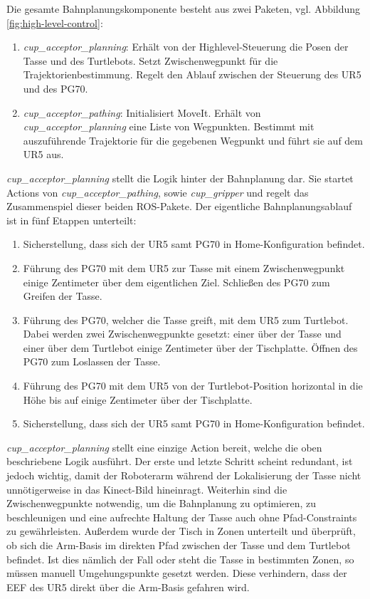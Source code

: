Die gesamte Bahnplanungskomponente besteht aus zwei Paketen, vgl. Abbildung \ref{fig:high-level-control}:
\begin{enumerate}
	\item \textit{cup\_acceptor\_planning}:
				\newline
				Erhält von der Highlevel-Steuerung die Posen der Tasse und des Turtlebots. Setzt Zwischenwegpunkt für die Trajektorienbestimmung. Regelt den Ablauf zwischen der Steuerung des UR5 und des PG70.
	\item \textit{cup\_acceptor\_pathing}:
				\newline
				Initialisiert MoveIt. Erhält von \textit{cup\_acceptor\_planning} eine Liste von Wegpunkten. Bestimmt mit auszuführende Trajektorie für die gegebenen Wegpunkt und führt sie auf dem UR5 aus.
\end{enumerate}
\textit{cup\_acceptor\_planning} stellt die Logik hinter der Bahnplanung dar. Sie startet Actions von \textit{cup\_acceptor\_pathing}, sowie \textit{cup\_gripper} und regelt das Zusammenspiel dieser beiden ROS-Pakete. Der eigentliche Bahnplanungsablauf ist in fünf Etappen unterteilt:
\begin{enumerate}
	\item Sicherstellung, dass sich der UR5 samt PG70 in Home-Konfiguration befindet.
	\item Führung des PG70 mit dem UR5 zur Tasse mit einem Zwischenwegpunkt einige Zentimeter über dem eigentlichen Ziel. Schließen des PG70 zum Greifen der Tasse.
	\item Führung des PG70, welcher die Tasse greift, mit dem UR5 zum Turtlebot. Dabei werden zwei Zwischenwegpunkte gesetzt: einer über der Tasse und einer über dem Turtlebot einige Zentimeter über der Tischplatte. Öffnen des PG70 zum Loslassen der Tasse.
	\item Führung des PG70 mit dem UR5 von der Turtlebot-Position horizontal in die Höhe bis auf einige Zentimeter über der Tischplatte.
	\item Sicherstellung, dass sich der UR5 samt PG70 in Home-Konfiguration befindet.
\end{enumerate}
\textit{cup\_acceptor\_planning} stellt eine einzige Action bereit, welche die oben beschriebene Logik ausführt. Der erste und letzte Schritt scheint redundant, ist jedoch wichtig, damit der Roboterarm während der Lokalisierung der Tasse nicht unnötigerweise in das Kinect-Bild hineinragt. Weiterhin sind die Zwischenwegpunkte notwendig, um die Bahnplanung zu optimieren, zu beschleunigen und eine aufrechte Haltung der Tasse auch ohne Pfad-Constraints zu gewährleisten. Außerdem wurde der Tisch in Zonen unterteilt und überprüft, ob sich die Arm-Basis im direkten Pfad zwischen der Tasse und dem Turtlebot befindet. Ist dies nämlich der Fall oder steht die Tasse in bestimmten Zonen, so müssen manuell Umgehungspunkte gesetzt werden. Diese verhindern, dass der EEF des UR5 direkt über die Arm-Basis gefahren wird.
